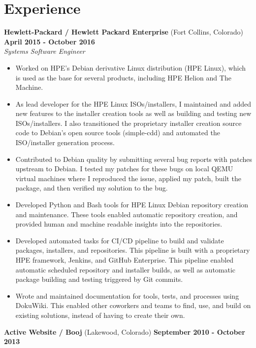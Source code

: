 \documentclass[a4paper,10pt]{article}
\begin{document}
    \section*{Experience}
        \vspace*{1ex}
        \textbf{Hewlett-Packard / Hewlett Packard Enterprise} (Fort Collins, Colorado) \hfill \textbf{April 2015 - October 2016} \\[1ex]
        \emph{Systems Software Engineer}
        \begin{itemize}
            \item Worked on HPE's Debian derivative Linux distribution (HPE Linux), which is used as the base for several products, including HPE Helion and The Machine.
            \item As lead developer for the HPE Linux ISOs/installers, I maintained and added new features to the installer creation tools as well as building and testing new ISOs/installers. I also transitioned the proprietary installer creation source code to Debian's open source tools (simple-cdd) and automated the ISO/installer generation process.
            \item Contributed to Debian quality by submitting several bug reports with patches upstream to Debian. I tested my patches for these bugs on local QEMU virtual machines where I reproduced the issue, applied my patch, built the package, and then verified my solution to the bug.
            \item Developed Python and Bash tools for HPE Linux Debian repository creation and maintenance. These tools enabled automatic repository creation, and provided human and machine readable insights into the repositories.
            \item Developed automated tasks for CI/CD pipeline to build and validate packages, installers, and repositories. This pipeline is built with a proprietary HPE framework, Jenkins, and GitHub Enterprise. This pipeline enabled automatic scheduled repository and installer builds, as well as automatic package building and testing triggered by Git commits.
            \item Wrote and maintained documentation for tools, tests, and processes using DokuWiki. This enabled other coworkers and teams to find, use, and build on existing solutions, instead of having to create their own.
        \end{itemize}
        \vspace*{2ex}
        \textbf{Active Website / Booj} (Lakewood, Colorado) \hfill \textbf{September 2010 - October 2013}
\end{document}
